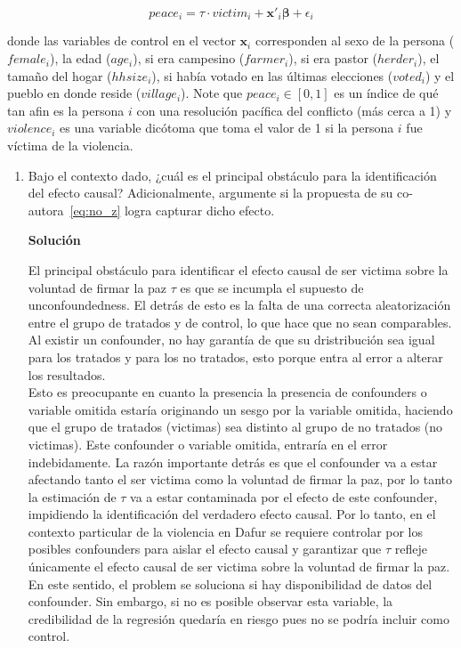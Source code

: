 \documentclass[a4paper, answers, addpoints, 11pt]{exam}
\newenvironment{solucion}{%
  \begin{mdframed}[
    backgroundcolor=blue!5,    %
    linecolor=blue!50,          %
    linewidth=2pt,              %
    leftmargin=10pt,            %
    rightmargin=10pt,           %
    topline=true,              %
    bottomline=true,            %
    roundcorner=10pt,           %
    innerleftmargin=10pt,       %
    innerrightmargin=10pt,      %
    innerbottommargin=10pt,     %
    innertopmargin=10pt         %
  ]%
  \begin{tcolorbox}[colframe=blue!50!black, colback=blue!50, coltitle=white, sharp corners=all, boxrule=1mm, width=\textwidth, halign=left, valign=center, top=0mm, bottom=0mm, left=0mm, right=0mm] \textbf{Solución} \end{tcolorbox} }{\end{mdframed}}
\begin{document}
\begin{equation}\label{eq:no_z}
    peace_i = \tau \cdot victim_i + \textbf{x}'_i\boldsymbol\beta + \epsilon_i
\end{equation}

    donde las variables de control en el vector $\textbf{x}_i$ corresponden al sexo de la persona ($female_i$), la edad ($age_i$), si era campesino ($farmer_i$), si era pastor ($herder_i$), el tamaño del hogar ($hhsize_i$), si había votado en las últimas elecciones ($voted_i$) y el pueblo en donde reside ($village_i$). Note que $peace_i \in [0,1]$ es un índice de qué tan afin es la persona $i$ con una resolución pacífica del conflicto (más cerca a 1) y $violence_i$ es una variable dicótoma que toma el valor de 1 si la persona $i$ fue víctima de la violencia.

\begin{enumerate}
    \item Bajo el contexto dado, ¿cuál es el principal obstáculo para la identificación del efecto causal? Adicionalmente, argumente si la propuesta de su co-autora~\eqref{eq:no_z} logra capturar dicho efecto.
    \begin{solucion}
        
        El principal obstáculo para identificar el efecto causal de ser victima sobre la voluntad de firmar la paz $\tau$ es que se incumpla el supuesto de unconfoundedness. El detrás de esto es la falta de una correcta aleatorización entre el grupo de tratados y de control, lo que hace que no sean comparables. Al existir un confounder, no hay garantía de que su dristribución sea igual para los tratados y para los no tratados, esto porque entra al error a alterar los resultados.\\
        
        
        Esto es preocupante en cuanto la presencia la presencia de confounders o variable omitida estaría originando un sesgo por la variable omitida, haciendo que el grupo de tratados (victimas) sea distinto al grupo de no tratados (no victimas). Este confounder o variable omitida, entraría en el error indebidamente. La razón importante detrás es que el confounder va a estar afectando tanto el ser victima como la voluntad de firmar la paz, por lo tanto la estimación de $\tau$ va a estar contaminada por el efecto de este confounder, impidiendo la identificación del verdadero efecto causal. Por lo tanto, en el contexto particular de la violencia en Dafur se requiere controlar por los posibles confounders para aislar el efecto causal y garantizar que $\tau$ refleje únicamente el efecto causal de ser victima sobre la voluntad de firmar la paz.  En este sentido, el problem se soluciona si hay disponibilidad de datos del confounder. Sin embargo, si no es posible observar esta variable, la credibilidad de la regresión quedaría en riesgo pues no se podría incluir como control.\\


\end{solucion}
\end{enumerate}
\end{document}
